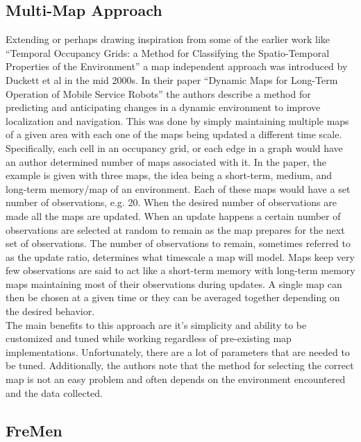   \subsection{ Multi-Map Approach }
  Extending or perhaps drawing inspiration from some of the earlier work like ``Temporal Occupancy Grids: a Method for
  Classifying the Spatio-Temporal Properties of the Environment''
  \cite{Arbuckle2002} a map independent approach was introduced by Duckett et al
  in the mid 2000s. In their paper ``Dynamic Maps for Long-Term Operation of Mobile Service Robots''
  the authors describe a method for predicting and anticipating changes in
  a dynamic environment to improve localization and navigation. This was done
  by simply maintaining multiple maps of a given area with each one of the maps
  being updated a different time scale. Specifically, each cell in an occupancy
  grid, or each edge in a graph would have an author determined number of maps
  associated with it. In the paper, the example is given with three maps, the
  idea being a short-term, medium, and long-term memory/map of an environment.
  Each of these maps would have a set number of observations, e.g. 20. When
  the desired number of observations are made all the maps are updated. When
  an update happens a certain number of observations are selected at random to
  remain as the map prepares for the next set of observations. The number of
  observations to remain, sometimes referred to as the update ratio, determines
  what timescale a map will model. Maps keep very few observations are said to
  act like a short-term memory with long-term memory maps maintaining most of
  their observations during updates. A single map can then be chosen at a given
  time or they can be averaged together depending on the desired behavior. \\

  The main benefits to this approach are it's simplicity and ability to be
  customized and tuned while working regardless of pre-existing map
  implementations. Unfortunately, there are a lot of parameters that are needed
  to be tuned. Additionally, the authors note that the method for selecting
  the correct map is not an easy problem and often depends on the environment
  encountered and the data collected.


  \subsection{ FreMen }

